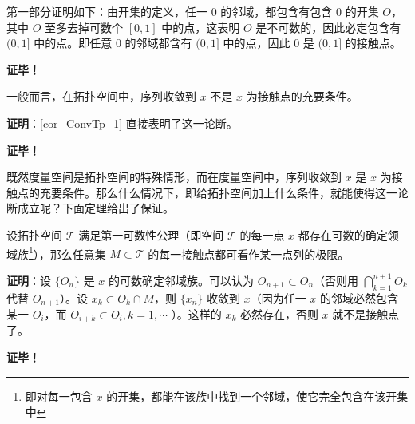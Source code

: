 第一部分证明如下：由开集的定义，任一 $0$ 的邻域，都包含有包含 $0$ 的开集 $O$，其中 $O$ 至多去掉可数个 $[0,1]$ 中的点，这表明 $O$ 是不可数的，因此必定包含有 $(0,1]$ 中的点。即任意 $0$ 的邻域都含有 $(0,1]$ 中的点，因此 $0$ 是 $(0,1]$ 的接触点。 

\textbf{证毕！}


 \begin{theorem}{}
 一般而言，在拓扑空间中，序列收敛到 $x$ 不是 $x$ 为接触点的充要条件。
 \end{theorem}
 \textbf{证明}：\autoref{cor_ConvTp_1} 直接表明了这一论断。

 \textbf{证毕！}

既然度量空间是拓扑空间的特殊情形，而在度量空间中，序列收敛到 $x$ 是 $x$ 为接触点的充要条件。那么什么情况下，即给拓扑空间加上什么条件，就能使得这一论断成立呢？下面定理给出了保证。


\begin{theorem}{}
设拓扑空间 $\mathcal T$ 满足第一可数性公理（即空间 $\mathcal T$ 的每一点 $x$ 都存在可数的确定领域族\footnote{即对每一包含 $x$ 的开集，都能在该族中找到一个邻域，使它完全包含在该开集中}），那么任意集 $M\subset\mathcal T$ 的每一接触点都可看作某一点列的极限。
\end{theorem}

 \textbf{证明}：设 $\{O_n\}$ 是 $x$ 的可数确定邻域族。可以认为 $O_{n+1}\subset O_n$（否则用 $\bigcap_{k=1}^{n+1} O_{k}$ 代替 $O_{n+1}$）。设 $x_k\subset O_k\cap M$，则 $\{x_n\}$ 收敛到 $x$（因为任一 $x$ 的邻域必然包含某一 $O_i$，而 $O_{i+k}\subset O_{i},k=1,\cdots$ ）。这样的 $x_k$ 必然存在，否则 $x$ 就不是接触点了。 

 
 \textbf{证毕！}




